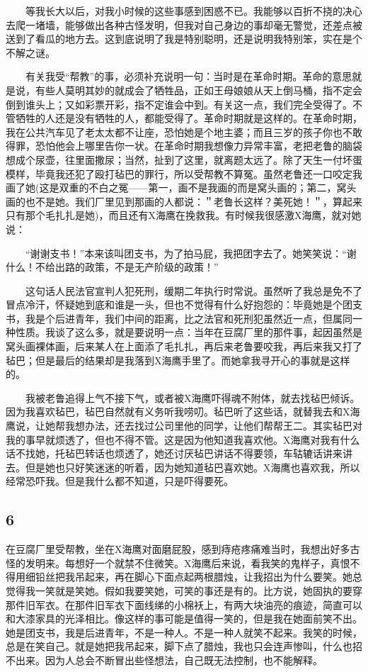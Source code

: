 　　等我长大以后，对我小时候的这些事感到困惑不已。我能够以百折不挠的决心去爬一堵墙，能够做出各种古怪发明，但我对自己身边的事却毫无警觉，还差点被送到了看瓜的地方去。这到底说明了我是特别聪明，还是说明我特别笨，实在是个不解之谜。

　　有关我受“帮教”的事，必须补充说明一句：当时是在革命时期。革命的意思就是说，有些人莫明其妙的就成会了牺牲品，正如王母娘娘从天上倒马桶，指不定会倒到谁头上；又如彩票开彩，指不定谁会中到。有关这一点，我们完全受得了。不管牺牲的人还是没有牺牲的人，都能受得了。革命时期就是这样的。在革命时期，我在公共汽车见了老太太都不让座，恐怕她是个地主婆；而且三岁的孩子你也不敢得罪，恐怕他会上哪里告你一状。在革命时期我想像力异常丰富，老把老鲁的脑袋想成个尿壶，往里面撒尿；当然，扯到了这里，就离题太远了。除了天生一付坏蛋模样，毕竟我还犯了殴打毡巴的罪行，所以受帮教不算冤。虽然老鲁还一口咬定我画了她(这是双重的不白之冤——第一，画不是我画的而是窝头画的；第二，窝头画的也不是她。我们厂里见到那画的人都说：＂老鲁长这样？美死她！＂，算起来只有那个毛扎扎是她)，而且还有X海鹰在挽救我。有时候我很感激X海鹰，就对她说： 

　　“谢谢支书！”本来该叫团支书，为了拍马屁，我把团字去了。她笑笑说：“谢什么！不给出路的政策，不是无产阶级的政策！” 

　　这句话人民法官宣判人犯死刑，缓期二年执行时常说。虽然听了我总是免不了冒点冷汗，怀疑她到底和谁是一头，但也不觉得有什么好抱怨的：毕竟她是个团支书，我是个后进青年，我们中间的距离，比之法官和死刑犯虽然近一点，但属同一种性质。我谈了这么多，就是要说明一点：当年在豆腐厂里的那件事，起因虽然是窝头画裸体画，后来某人在上面添了毛扎扎，再后来老鲁要咬我，再后来我又打了毡巴；但是最后的结果却是我落到X海鹰手里了。而她拿我寻开心的事就是这样的。

　　我被老鲁追得上气不接下气，或者被X海鹰吓得魂不附体，就去找毡巴倾诉。因为我喜欢毡巴，毡巴自然就有义务听我唠叨。毡巴听了这些话，就替我去和X海鹰说，让她帮我想办法，还去找过公司里他的同学，让他们帮帮王二。其实毡巴对我的事早就烦透了，但也不得不管。这是因为他知道我喜欢他。X海鹰对我有什么话不找她，托毡巴转话也烦透了，她还讨厌毡巴讲话不得要领，车轱辘话讲来讲去。但是她也只好笑迷迷的听着，因为她知道毡巴喜欢她。X海鹰也喜欢我，所以经常恐吓我。但是我什么都不知道，只是吓得要死。

\subsection{6}

在豆腐厂里受帮教，坐在X海鹰对面磨屁股，感到痔疮疼痛难当时，我想出好多古怪的发明来。每想好一个就禁不住微笑。X海鹰后来说，看我笑的鬼样子，真恨不得用细铅丝把我吊起来，再在脚心下面点起两根腊烛，让我招出为什么要笑。她总觉得我一笑就是笑她。假如我要笑她，可笑的事还是有的。比方说，她固执的要穿那件旧军衣。在那件旧军衣下面线绨的小棉袄上，有两大块油亮的痕迹，简直可以和大漆家具的光泽相比。像这样的事可能是值得一笑的，但是我在她面前笑不出。她是团支书，我是后进青年，不是一种人。不是一种人就笑不起来。我笑的时候，总是在笑自己。就是她把我吊起来，脚下点了腊烛，我也只会连声惨叫，什么也招不出来。因为人总会不断冒出些怪想法，自己既无法控制，也不能解释。 

